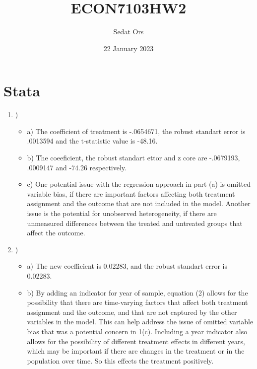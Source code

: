 \documentclass{article}
\title{ECON7103HW2}
\author{Sedat Ors}
\date{22 January 2023}
\begin{document}
\maketitle

\section{Stata}

\vspace{0.5cm}

\begin{enumerate}

\item )

\begin{itemize}

\item a) The coefficient of treatment is  -.0654671, the robust standart error is .0013594 and the t-statistic value is -48.16. 
\vspace{0.5cm}

\item b) The coeeficient, the robust standart ettor and z core are  -.0679193, .0009147 and  -74.26 respectively.

\vspace{0.5cm}

\item c) One potential issue with the regression approach in part (a) is omitted variable bias, if there are important factors affecting both treatment assignment and the outcome that are not included in the model. Another issue is the potential for unobserved heterogeneity, if there are unmeasured differences between the treated and untreated groups that affect the outcome.

\end {itemize}

\item )
\begin{itemize}

\item a) The new coefficient is 0.02283, and the robust standart error is 0.02283. 

\vspace{0.5cm}

\item b) By adding an indicator for year of sample, equation (2) allows for the possibility that there are time-varying factors that affect both treatment assignment and the outcome, and that are not captured by the other variables in the model. This can help address the issue of omitted variable bias that was a potential concern in 1(c). Including a year indicator also allows for the possibility of different treatment effects in different years, which may be important if there are changes in the treatment or in the population over time. So this effects the treatment positively. 


\end{itemize}
\end{enumerate}
\end{document}
